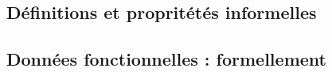 \subsection{Définitions et propritétés informelles}



\subsection{Données fonctionnelles : formellement}

